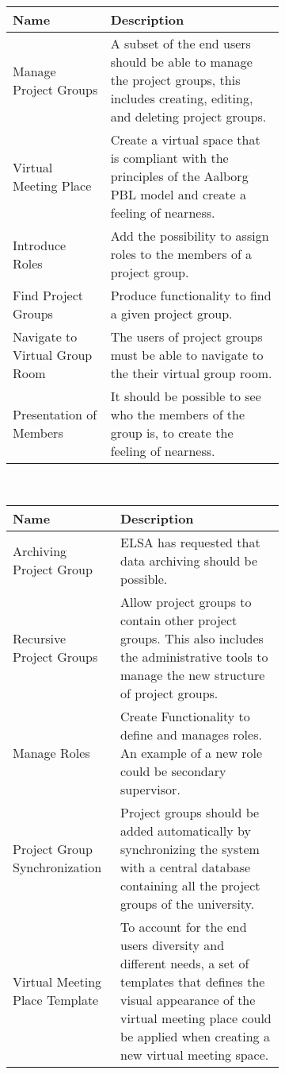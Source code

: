 \begin{figure}%
\begin{subfigure}[b]{\textwidth}
\begin{tabular}{|p{}|p{}|}
	\hline
	\textbf{Name} & \textbf{Description} \\
	\hline
	Manage Project Groups & A subset of the end users should be able to manage the project groups, this includes creating, editing, and deleting project groups.  \\
	\hline
	Virtual Meeting Place & Create a virtual space that is compliant with the principles of the Aalborg PBL model and create a feeling of nearness.  \\
	\hline
	Introduce Roles & Add the possibility to assign roles to the members of a project group. \\
	\hline
	Find Project Groups & Produce functionality to find a given project group.\\
	\hline
	Navigate to Virtual Group Room & The users of project groups must be able to navigate to the their virtual group room. \\
	\hline
	Presentation of Members & It should be possible to see who the members of the group is, to create the feeling of nearness. \\
	\hline
	\end{tabular}\\
\end{subfigure}
	
	\vspace{10 mm}
	\begin{subfigure}[b]{\textwidth}
	\begin{tabular}{|p{}|p{}|}
	\hline
	\textbf{Name} & \textbf{Description} \\
	\hline
	Archiving Project Group & {ELSA has requested that data archiving should be possible.} \\
	\hline 
	Recursive Project Groups & {Allow project groups to contain other project groups. This also includes the administrative tools to manage the new structure of project groups.} \\
	{Manage Roles} & {Create Functionality to define and manages roles. An example of a new role  could be secondary supervisor.} \\
	\hline
	{Project Group Synchronization} & {Project groups should be added automatically by synchronizing the system with a central database containing all the project groups of the university.}  \\
	\hline 
	Virtual Meeting Place Template & {To account for the end users diversity and different needs, a set of templates that defines the visual appearance of the virtual meeting place could be applied when creating a new virtual meeting space.}  \\
	\hline
\end{tabular}
\end{subfigure}
\label{fig:productbacklog}
\end{figure}

